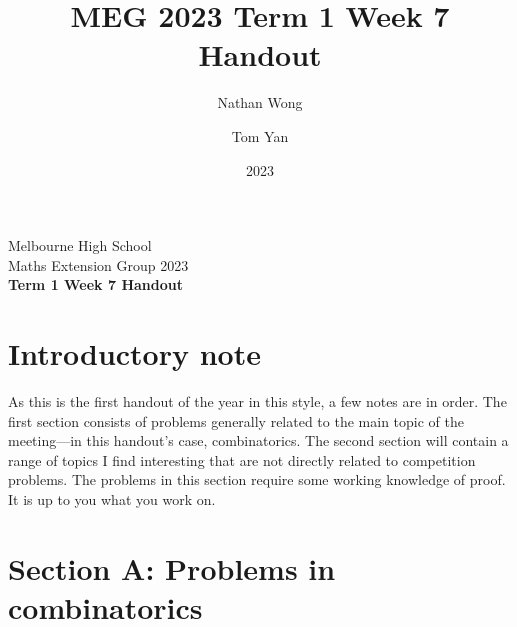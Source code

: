 \documentclass[a4paper]{article}
\title{MEG 2023 Term 1 Week 7 Handout}
\author{Nathan Wong\and Tom Yan}
\date{2023}
\newcommand{\thetitle}{Term 1 Week 7 Handout}
\begin{document}
\noindent Melbourne High School\\
Maths Extension Group 2023\\
\textbf{\thetitle}\\
\section*{Introductory note}
As this is the first handout of the year in this style, a few notes
are in order. The first section consists of problems generally
related to the main topic of the meeting---in this handout's case,
combinatorics. The second section will contain a range of topics I find
interesting that are not directly related to competition problems. The
problems in this section require some working knowledge of proof. It is
up to you what you work on.
\onecolumn
\section*{Section A: Problems in combinatorics}

\twocolumn

\end{document}
